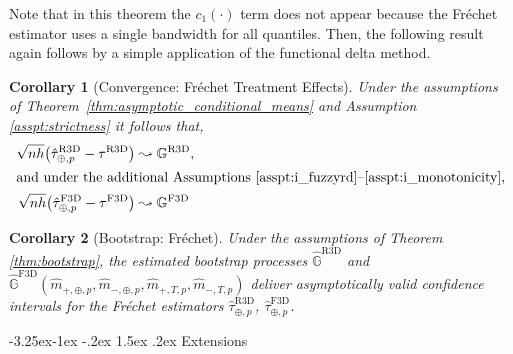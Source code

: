 \documentclass[12pt]{article}
\makeatletter
\renewcommand\subsection{\@startsection{subsection}{2}{\z@}%
  {-3.25ex\@plus -1ex \@minus -.2ex}%
  {1.5ex \@plus .2ex}%
  {\itshape\large\center}} %
\newtheorem{corollary}{Corollary}
\newcommand{\nddvd}[1]{{\color{blue}[David: #1]}}
\makeatother
\begin{document}
Note that in this theorem the $c_1(\cdot)$ term does not appear because the Fr\'echet estimator uses a single bandwidth for all quantiles. 
Then, the following result again follows by a simple application of the functional delta method. 

\begin{corollary}[Convergence: Fr\'echet Treatment Effects] \label{corollary:frechet_treatment}
Under the assumptions of Theorem~\ref{thm:asymptotic_conditional_means} and Assumption \ref{asspt:strictness} it follows that, 
\begin{align*}
 \sqrt{n h}\bigl(\hat{\tau}_{\oplus,p}^{\mathrm{R3D}}- \tau^{\mathrm{R3D}}\bigr)
  & \leadsto \mathbb{G}^{\mathrm{R3D}},  \\
\intertext{and under the additional Assumptions \ref{asspt:i_fuzzyrd}--\ref{asspt:i_monotonicity},}
 \sqrt{n h}\bigl(\hat{\tau}_{\oplus,p}^{\mathrm{F3D}}- \tau^{\mathrm{F3D}}\bigr) &  \leadsto  \mathbb{G}^{\mathrm{F3D}} 
\end{align*}
\end{corollary}

\begin{corollary}[Bootstrap: Fr\'echet] \label{thm:bootstrap_frechet}
Under the assumptions of Theorem \ref{thm:bootstrap}, the estimated bootstrap processes $\hat{\mathbb{G}}^{\mathrm{R3D}}$ and $\hat{\mathbb{G}}^{\mathrm{F3D}}\left(\hat{m}_{+,\oplus,p}, \hat{m}_{-,\oplus,p}, \hat{m}_{+,T,p}, \hat{m}_{-,T,p}\right)$ deliver asymptotically valid confidence intervals for the Fr\'echet estimators $\hat{\tau}_{\oplus,p}^{\mathrm{R3D}}$, $\hat{\tau}_{\oplus,p}^{\mathrm{F3D}}$.
\end{corollary}


\subsection{Extensions}

\end{document}
